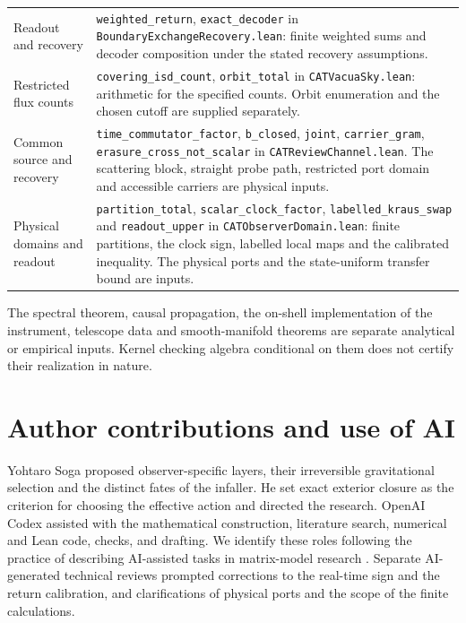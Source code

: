 \begin{center}
\begin{tabularx}{\linewidth}{@{}L{.22\linewidth}X@{}}
Readout and recovery & \texttt{weighted\_return}, \texttt{exact\_decoder} in \texttt{BoundaryExchangeRecovery.lean}: finite weighted sums and decoder composition under the stated recovery assumptions.\\
Restricted flux counts & \texttt{covering\_isd\_count}, \texttt{orbit\_total} in \texttt{CATVacuaSky.lean}: arithmetic for the specified counts. Orbit enumeration and the chosen cutoff are supplied separately.\\
Common source and recovery & \texttt{time\_commutator\_factor}, \texttt{b\_closed}, \texttt{joint}, \texttt{carrier\_gram}, \texttt{erasure\_cross\_not\_scalar} in \texttt{CATReviewChannel.lean}. The scattering block, straight probe path, restricted port domain and accessible carriers are physical inputs.\\
Physical domains and readout & \texttt{partition\_total}, \texttt{scalar\_clock\_factor}, \texttt{labelled\_kraus\_swap} and \texttt{readout\_upper} in \texttt{CATObserverDomain.lean}: finite partitions, the clock sign, labelled local maps and the calibrated inequality. The physical ports and the state-uniform transfer bound are inputs.\\
\bottomrule\end{tabularx}
\end{center}
The spectral theorem, causal propagation, the on-shell implementation of the instrument, telescope data and smooth-manifold theorems are separate analytical or empirical inputs. Kernel checking algebra conditional on them does not certify their realization in nature.

\section*{Author contributions and use of AI}
Yohtaro Soga proposed observer-specific layers, their irreversible gravitational selection and the distinct fates of the infaller. He set exact exterior closure as the criterion for choosing the effective action and directed the research. OpenAI Codex assisted with the mathematical construction, literature search, numerical and Lean code, checks, and drafting. We identify these roles following the practice of describing AI-assisted tasks in matrix-model research \cite{aidisclosure}. Separate AI-generated technical reviews prompted corrections to the real-time sign and the return calibration, and clarifications of physical ports and the scope of the finite calculations.

\clearpage



